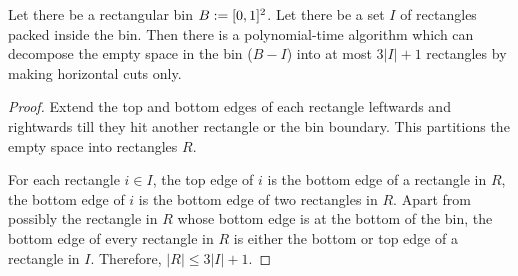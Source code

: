 \begin{lemma}
\label{lem:empty-to-rects}
Let there be a rectangular bin $B := [0, 1]^2$.
Let there be a set $I$ of rectangles packed inside the bin.
Then there is a polynomial-time algorithm which can decompose the empty space in the bin
($B - I$) into at most $3|I|+1$ rectangles by making horizontal cuts only.
\end{lemma}
\begin{proof}
Extend the top and bottom edges of each rectangle leftwards and rightwards
till they hit another rectangle or the bin boundary.
This partitions the empty space into rectangles $R$.

For each rectangle $i \in I$, the top edge of $i$ is the bottom edge of a rectangle in $R$,
the bottom edge of $i$ is the bottom edge of two rectangles in $R$.
Apart from possibly the rectangle in $R$ whose bottom edge is at the bottom of the bin,
the bottom edge of every rectangle in $R$ is either the bottom or top edge of a rectangle in $I$.
Therefore, $|R| \le 3|I| + 1$.
\end{proof}

